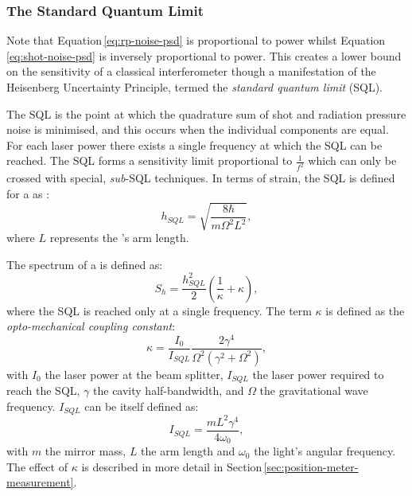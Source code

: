 \subsubsection{\label{sec:sql}The Standard Quantum Limit}
Note that Equation\,\ref{eq:rp-noise-psd} is proportional to power whilst Equation\,\ref{eq:shot-noise-psd} is inversely proportional to power. This creates a lower bound on the sensitivity of a classical interferometer though a manifestation of the Heisenberg Uncertainty Principle, termed the \emph{standard quantum limit} (\gls{SQL}).

The \gls{SQL} is the point at which the quadrature sum of shot and radiation pressure noise is minimised, and this occurs when the individual components are equal. For each laser power there exists a single frequency at which the \gls{SQL} can be reached. The \gls{SQL} forms a sensitivity limit proportional to $\frac{1}{f^2}$ which can only be crossed with special, \emph{sub}-\gls{SQL} techniques. In terms of strain, the \gls{SQL} is defined for a \MI{} as \cite{Braginsky1996}:
\begin{equation}
  \label{eq:strainsql}
  h_{SQL} = \sqrt{\frac{8 \hbar}{m \Omega^2 L^2}},
\end{equation}
where $L$ represents the \MI{}'s arm length.

The spectrum of a \MI{} is defined as:
\begin{equation}
  \label{eq:classicalifospectrum}
  S_h = \frac{h^{2}_{SQL}}{2} \left( \frac{1}{\kappa} + \kappa \right),
\end{equation}
where the \gls{SQL} is reached only at a single frequency. The term $\kappa$ is defined as the \emph{opto-mechanical coupling constant}:
\begin{equation}
 \kappa = \frac{I_0}{I_{SQL}} \frac{2 \gamma^4}{\Omega^2 \left( \gamma^2 +
\Omega^2 \right)},
 \label{eq:optomechanicalcoupling}
\end{equation}
with $I_0$ the laser power at the beam splitter, $I_{SQL}$ the laser power required to reach the \gls{SQL}, $\gamma$ the cavity half-bandwidth, and $\Omega$ the gravitational wave frequency. $I_{SQL}$ can be itself defined as:
\begin{equation}
 I_{SQL} = \frac{m L^2 \gamma^4}{4 \omega_0},
\end{equation}
with $m$ the mirror mass, $L$ the arm length and $\omega_0$ the light's angular frequency. The effect of $\kappa$ is described in more detail in Section\,\ref{sec:position-meter-measurement}.

